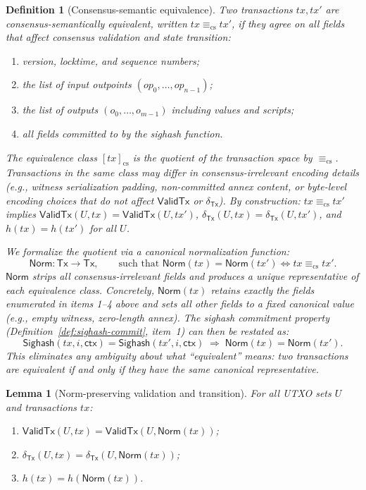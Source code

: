 \documentclass[11pt]{article}
\newtheorem{definition}{Definition}
\newtheorem{lemma}{Lemma}
\newcommand{\Tx}{\mathsf{Tx}}
\newcommand{\Sighash}{\mathsf{Sighash}}
\newcommand{\ValidTx}{\mathsf{ValidTx}}
\newcommand{\DeltaTx}{\delta_{\Tx}}
\begin{document}
\begin{definition}[Consensus-semantic equivalence]\label{def:cs-equiv}
Two transactions $tx,tx'$ are \emph{consensus-semantically equivalent}, written $tx\equiv_{\mathrm{cs}}tx'$, if they agree on all fields that affect consensus validation and state transition:
\begin{enumerate}[leftmargin=2em]
  \item version, locktime, and sequence numbers;
  \item the list of input outpoints $(op_0,\dots,op_{n-1})$;
  \item the list of outputs $(o_0,\dots,o_{m-1})$ including values and scripts;
  \item all fields committed to by the sighash function.
\end{enumerate}
The equivalence class $[tx]_{\mathrm{cs}}$ is the quotient of the transaction space by $\equiv_{\mathrm{cs}}$.
Transactions in the same class may differ in consensus-irrelevant encoding details (e.g., witness serialization padding, non-committed annex content, or byte-level encoding choices that do not affect $\ValidTx$ or $\DeltaTx$).
By construction: $tx\equiv_{\mathrm{cs}}tx'$ implies $\ValidTx(U,tx)=\ValidTx(U,tx')$, $\DeltaTx(U,tx)=\DeltaTx(U,tx')$, and $h(tx)=h(tx')$ for all $U$.

We formalize the quotient via a \emph{canonical normalization function}:
\[
\mathsf{Norm}:\Tx\to\Tx, \qquad \text{such that } \mathsf{Norm}(tx)=\mathsf{Norm}(tx') \iff tx\equiv_{\mathrm{cs}}tx'.
\]
$\mathsf{Norm}$ strips all consensus-irrelevant fields and produces a unique representative of each equivalence class.
Concretely, $\mathsf{Norm}(tx)$ retains exactly the fields enumerated in items 1--4 above and sets all other fields to a fixed canonical value (e.g., empty witness, zero-length annex).
The sighash commitment property (Definition~\ref{def:sighash-commit}, item~1) can then be restated as:
\[
\Sighash(tx,i,\textsf{ctx})=\Sighash(tx',i,\textsf{ctx}) \;\Longrightarrow\; \mathsf{Norm}(tx)=\mathsf{Norm}(tx').
\]
This eliminates any ambiguity about what ``equivalent'' means: two transactions are equivalent if and only if they have the same canonical representative.
\end{definition}

\begin{lemma}[Norm-preserving validation and transition]\label{lem:norm-preserve}
For all UTXO sets $U$ and transactions $tx$:
\begin{enumerate}[leftmargin=2em]
  \item $\ValidTx(U,tx)=\ValidTx(U,\mathsf{Norm}(tx))$;
  \item $\DeltaTx(U,tx)=\DeltaTx(U,\mathsf{Norm}(tx))$;
  \item $h(tx)=h(\mathsf{Norm}(tx))$.
\end{enumerate}
\end{lemma}
\end{document}
